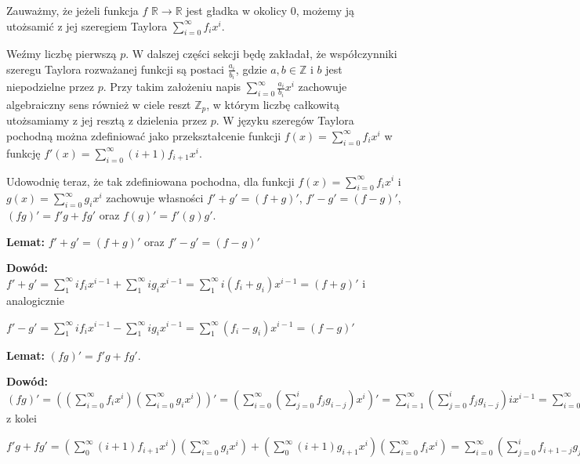 \documentclass{article}
\begin{document}
Zauważmy, że jeżeli funkcja $f$ $\mathbb{R}\to \mathbb{R}$ jest gładka w okolicy $0$, możemy ją utożsamić z jej szeregiem Taylora $\sum_{i=0}^{\infty}f_ix^i$. 

Weźmy liczbę pierwszą $p$. W dalszej części sekcji będę zakładał, że współczynniki szeregu Taylora 
rozważanej funkcji są postaci 
$\frac{a_i}{b_i}$, gdzie $a,b \in \mathbb{Z}$ i  $b$ jest niepodzielne przez $p$. Przy takim założeniu napis  
$\sum_{i=0}^{\infty}\frac{a_i}{b_i}x^i$ zachowuje algebraiczny sens również w ciele reszt $\mathbb{Z}_p$, w którym 
liczbę całkowitą utożsamiamy z jej resztą z dzielenia przez $p$. W języku szeregów Taylora pochodną można 
zdefiniować jako przekształcenie funkcji $f(x)=\sum_{i=0}^\infty f_ix^i$ w funkcję 
$f '(x)=\sum_{i=0}^{\infty}(i+1)f_{i+1}x^i$. 

Udowodnię teraz, że tak zdefiniowana pochodna, dla funkcji $f(x)=\sum_{i=0}^{\infty}f_ix^i$ i
$g(x)=\sum_{i=0}^{\infty}g_ix^i$ zachowuje własności $f'+g'=(f+g)'$, $f'-g'=(f-g)'$, $(fg)'=f'g+fg'$ oraz 
$f(g)'=f'(g)g'$.

\begin{tcolorbox}
    \textbf{Lemat:} $f'+g'=(f+g)'$ oraz $f'-g'=(f-g)'$
    
    \textbf{Dowód:} $f'+g'=\sum_{1}^{\infty}if_ix^{i-1}+\sum_{1}^{\infty}ig_ix^{i-1}=
    \sum_{1}^{\infty}i(f_i+g_i)x^{i-1}=(f+g)'$ i analogicznie
    
    $f'-g'=\sum_{1}^{\infty}if_ix^{i-1}-\sum_{1}^{\infty}ig_ix^{i-1}=
    \sum_{1}^{\infty}(f_i-g_i)x^{i-1}=(f-g)'$ 
\end{tcolorbox}

\begin{tcolorbox}
    \textbf{Lemat:} $(fg)'=f'g+fg'$.
    
    \textbf{Dowód:} $(fg)'=((\sum_{i=0}^{\infty}f_ix^i)(\sum_{i=0}^{\infty}g_ix^i))'=
    (\sum_{i=0}^{\infty}(\sum_{j=0}^if_jg_{i-j})x^i)'=
    \sum_{i=1}^{\infty}(\sum_{j=0}^if_jg_{i-j})ix^{i-1}=
    \sum_{i=0}^{\infty}(\sum_{j=0}^if_jg_{i+1-j})(i+1)x^{i}$ z kolei

    $f'g+fg'=(\sum_{0}^{\infty}(i+1)f_{i+1}x^{i})(\sum_{i=0}^{\infty}g_ix^i)+(\sum_{0}^{\infty}(i+1)g_{i+1}x^{i})(\sum_{i=0}^{\infty}f_ix^i)=
    \sum_{i=0}^\infty(\sum_{j=0}^{i}f_{i+1-j}g_{j}(i+1-j))x^i+
    \sum_{i=0}^\infty(\sum_{j=0}^{i}g_{i+1-j}f_{j}(i+1-j))x^i=
    \sum_{i=0}^\infty(\sum_{j=0}^{i}g_{i+1-j}f_{j}(i+1-j+j))x^i=
    \sum_{i=0}^\infty(\sum_{j=0}^{i}g_{i+1-j}f_{j})(i+1)x^i=(fg)'
    $
\end{tcolorbox}
\end{document}
